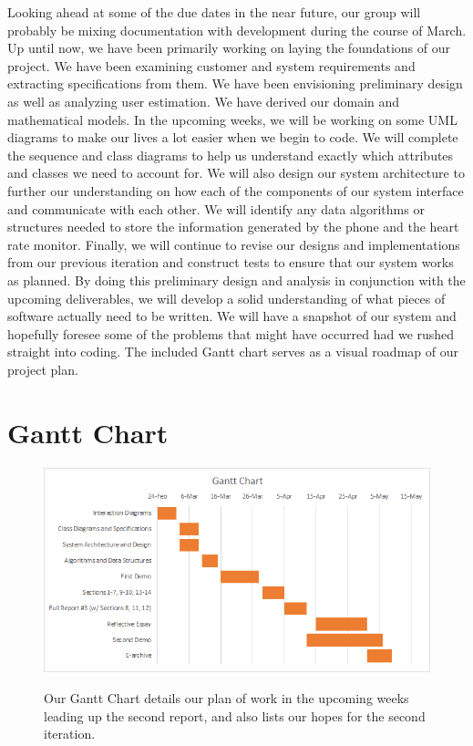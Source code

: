 \documentclass[letterpaper,english, 12pt]{scrreprt}
\begin{document}
Looking ahead at some of the due dates in the near future, our group will probably be mixing documentation with development during the course of March. Up until now, we have been primarily working on laying the foundations of our project. We have been examining customer and system requirements and extracting specifications from them. We have been envisioning preliminary design as well as analyzing user estimation. We have derived our domain and mathematical models. 
In the upcoming weeks, we will be working on some UML diagrams to make our lives a lot easier when we begin to code. We will complete the sequence and class diagrams to help us understand exactly which attributes and classes we need to account for. We will also design our system architecture to further our understanding on how each of the components of our system interface and communicate with each other. We will identify any data algorithms or structures needed to store the information generated by the phone and the heart rate monitor. Finally, we will continue to revise our designs and implementations from our previous iteration and construct tests to ensure that our system works as planned.
By doing this preliminary design and analysis in conjunction with the upcoming deliverables, we will develop a solid understanding of what pieces of software actually need to be written. We will have a snapshot of our system and hopefully foresee some of the problems that might have occurred had we rushed straight into coding.
The included Gantt chart serves as a visual roadmap of our project plan.

\section{Gantt Chart}


\begin{figure}[H]
	\centering
	\includegraphics{img/Gantt_Chart.png}\\
	\caption{Our Gantt Chart details our plan of work in the upcoming weeks leading up the second report, and also lists our hopes for the second iteration.}
\end{figure}
\end{document}
